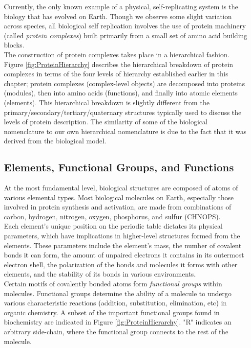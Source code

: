 {Currently, the only known example of a physical, self-replicating system is the biology that has evolved on Earth.  Though we observe some slight variation across species, all biological self replication involves the use of protein machinery (called \textit{protein complexes}) built primarily from a small set of amino acid building blocks.\\

The construction of protein complexes takes place in a hierarchical fashion.  Figure \ref{fig:ProteinHierarchy} describes the hierarchical breakdown of protein complexes in terms of the four levels of hierarchy established earlier in this chapter; protein complexes (complex-level objects) are decomposed into proteins (modules), then into amino acids (functions), and finally into atomic elements (elements).  This hierarchical breakdown is slightly different from the primary/secondary/tertiary/quaternary structures typically used to discuss the levels of protein description.  The similarity of some of the biological nomenclature to our own hierarchical nomenclature is due to the fact that it was derived from the biological model.

\subsection{Elements, Functional Groups, and Functions}

At the most fundamental level, biological structures are composed of atoms of various elemental types.  Most biological molecules on Earth, especially those involved in protein synthesis and activation, are made from combinations of carbon, hydrogen, nitrogen, oxygen, phosphorus, and sulfur (CHNOPS).\\

Each element's unique position on the periodic table dictates its physical parameters, which have implications in higher-level structures formed from the elements.  These parameters include the element's mass, the number of covalent bonds it can form, the amount of unpaired electrons it contains in its outermost electron shell, the polarization of the bonds and molecules it forms with other elements, and the stability of its bonds in various environments.\\

Certain motifs of covalently bonded atoms form \textit{functional groups} within molecules.  Functional groups determine the ability of a molecule to undergo various characteristic reactions (addition, substitution, elimination, etc) in organic chemistry.  A subset of the important functional groups found in biochemistry are indicated in Figure \ref{fig:ProteinHierarchy}.  "R" indicates an arbitrary side-chain, where the functional group connects to the rest of the molecule.\\

}
